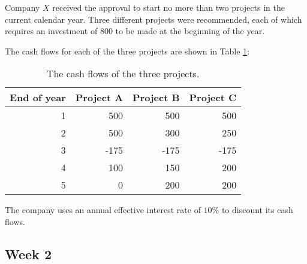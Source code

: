 \documentclass[
]{book}
\begin{document}
Company \(X\) received the approval to start no more than two projects in the current calendar year.
Three different projects were recommended, each of which requires an investment of 800 to be made at the beginning of the year.

The cash flows for each of the three projects are shown in Table \ref{tab:week1}:

\begin{table}

\caption{\label{tab:week1}The cash flows of the three projects.}
\centering
\begin{tabular}[t]{r|r|r|r}
\hline
End of year & Project A & Project B & Project C\\
\hline
1 & 500 & 500 & 500\\
\hline
2 & 500 & 300 & 250\\
\hline
3 & -175 & -175 & -175\\
\hline
4 & 100 & 150 & 200\\
\hline
5 & 0 & 200 & 200\\
\hline
\end{tabular}
\end{table}

The company uses an annual effective interest rate of \(10\%\) to discount its cash flows.

\hypertarget{week-2}{%
\subsection*{Week 2}\label{week-2}}

  
\end{document}
